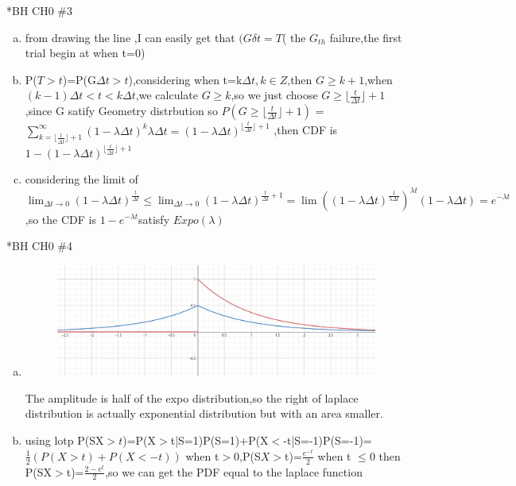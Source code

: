 \documentclass{article}
\begin{document}
\begin{homeworkProblem}*{BH CH0 \#3}
	\begin{enumerate}[(a)]
		\item from drawing the line ,I can easily get that $(G\delta t=T$( the $G_{th}$ failure,the first trial begin at when t=0)
	\item P($T>t$)=P(G$\Delta t>t$),considering when t=k$\Delta t,k\in Z$,then $G\geq k+1$,when $(k-1)\Delta t<t<k\Delta t$,we calculate $G\geq k$,so we just choose $G\geq \lfloor \frac{t}{\Delta t}\rfloor+1$,since G satify Geometry distrbution so $P(G\geq \lfloor \frac{t}{\Delta t}\rfloor+1)$
=$\sum_{k=\lfloor \frac{t}{\Delta t}\rfloor+1}^{\infty}(1-\lambda \Delta t)^{k}\lambda \Delta t=(1-\lambda \Delta t)^{\lfloor \frac{t}{\Delta t}\rfloor+1}$	,then CDF is $1-(1-\lambda \Delta t)^{\lfloor \frac{t}{\Delta t}\rfloor+1}$
\item considering the limit of $\lim_{\Delta t\to 0}(1-\lambda \Delta t)^{ \frac{t}{\Delta t} }\leq\lim_{\Delta t\to 0}(1-\lambda \Delta t)^{\frac{t}{\Delta t} +1}=\lim((1-\lambda\Delta t)^{\frac{1}{\lambda \Delta t}})^{\lambda t}(1-\lambda\Delta t)=e^{-\lambda t}$,so the CDF is $1-e^{-\lambda t}$satisfy $Expo(\lambda)$
\end{enumerate}
\end{homeworkProblem}
\begin{homeworkProblem}*{BH CH0 \#4}
	\begin{enumerate}[(a)]
\item \begin{figure}[htbp]
	\includegraphics{p4.jpg}
\end{figure}
The amplitude is half of the expo distribution,so the right of laplace distribution is actually exponential distribution but with an area smaller.
\item using lotp P(SX$>t$)=P(X$>$t|S=1)P(S=1)+P(X$<$-t|S=-1)P(S=-1)=$\frac{1}{2}(P(X>t)+P(X<-t))$ when t$>$0,P(S$X>$t)=$\frac{e^{-t}}{2}$ when t $\leq$0 then P(SX$>$t)=$\frac{2-e^t}{2}$,so we can get the PDF equal to the laplace function
\end{enumerate}
\end{homeworkProblem}
\end{document}
